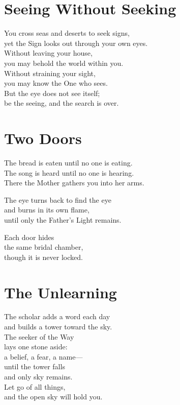 \documentclass[10pt, openright]{book}
\newcommand{\sectionbreak}{\filbreak}
\newcommand{\sayingsource}[1]{\par\nopagebreak\vspace{0.3\baselineskip}{\raggedleft\footnotesize\itshape #1\par}}
\begin{document}
\sayingsource{Thomas 87, 112}

\sectionbreak

\section{Seeing Without Seeking}\label{seeing-without-seeking}

You cross seas and deserts to seek signs,\\
yet the Sign looks out through your own eyes.\\
Without leaving your house,\\
you may behold the world within you.\\
Without straining your sight,\\
you may know the One who sees.\\
But the eye does not see itself;\\
be the seeing, and the search is over.

\sayingsource{Tao Te Ching 47 · Thomas 3 · Luke 17:21 · Mary 8 ·
Brihadaranyaka Upanishad 3.4.2}

\sectionbreak

\section{Two Doors}\label{two-doors}

The bread is eaten until no one is eating.\\
The song is heard until no one is hearing.\\
There the Mother gathers you into her arms.

The eye turns back to find the eye\\
and burns in its own flame,\\
until only the Father's Light remains.

Each door hides\\
the same bridal chamber,\\
though it is never locked.

\sayingsource{Brihadaranyaka Upanishad 3.4.2 · Udana 1.10 · Thomas 77 ·
Philip · Vijñāna Bhairava 41, 72}

\sectionbreak

\section{The Unlearning}\label{the-unlearning}

The scholar adds a word each day\\
and builds a tower toward the sky.\\
The seeker of the Way\\
lays one stone aside:\\
a belief, a fear, a name---\\
until the tower falls\\
and only sky remains.\\
Let go of all things,\\
and the open sky will hold you.
\end{document}
